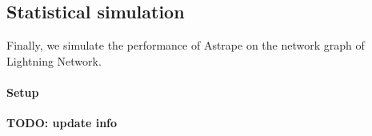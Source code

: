 \documentclass[USenglish,oneside,twocolumn]{article}
\begin{document}

\subsection{Statistical simulation}

Finally, we simulate the performance of Astrape on the network graph of Lightning Network.

\paragraph*{Setup}

\textbf{TODO: update info}
\end{document}
